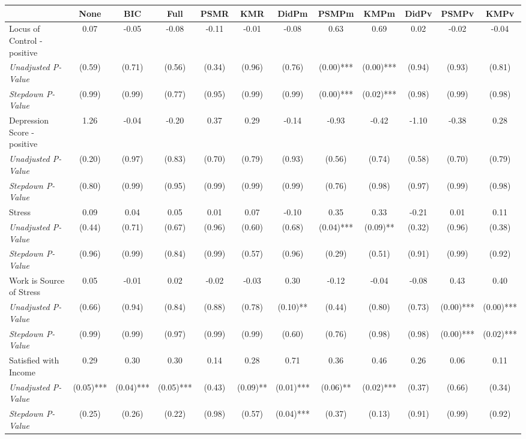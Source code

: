 \begin{tabular}{l c c c c c c c c c c c}
\toprule
 & None & BIC & Full & PSMR & KMR & DidPm & PSMPm & KMPm & DidPv & PSMPv & KMPv \\
\midrule
Locus of Control - positive & 0.07 & -0.05 & -0.08 & -0.11 & -0.01 & -0.08 & 0.63 & 0.69 & 0.02 & -0.02 & -0.04 \\
\quad \textit{Unadjusted P-Value} & (0.59) & (0.71) & (0.56) & (0.34) & (0.96) & (0.76) & (0.00)*** & (0.00)*** & (0.94) & (0.93) & (0.81) \\
\quad \textit{Stepdown P-Value} & (0.99) & (0.99) & (0.77) & (0.95) & (0.99) & (0.99) & (0.00)*** & (0.02)*** & (0.98) & (0.99) & (0.98) \\
Depression Score - positive & 1.26 & -0.04 & -0.20 & 0.37 & 0.29 & -0.14 & -0.93 & -0.42 & -1.10 & -0.38 & 0.28 \\
\quad \textit{Unadjusted P-Value} & (0.20) & (0.97) & (0.83) & (0.70) & (0.79) & (0.93) & (0.56) & (0.74) & (0.58) & (0.70) & (0.79) \\
\quad \textit{Stepdown P-Value} & (0.80) & (0.99) & (0.95) & (0.99) & (0.99) & (0.99) & (0.76) & (0.98) & (0.97) & (0.99) & (0.98) \\
Stress & 0.09 & 0.04 & 0.05 & 0.01 & 0.07 & -0.10 & 0.35 & 0.33 & -0.21 & 0.01 & 0.11 \\
\quad \textit{Unadjusted P-Value} & (0.44) & (0.71) & (0.67) & (0.96) & (0.60) & (0.68) & (0.04)*** & (0.09)** & (0.32) & (0.96) & (0.38) \\
\quad \textit{Stepdown P-Value} & (0.96) & (0.99) & (0.84) & (0.99) & (0.57) & (0.96) & (0.29) & (0.51) & (0.91) & (0.99) & (0.92) \\
Work is Source of Stress & 0.05 & -0.01 & 0.02 & -0.02 & -0.03 & 0.30 & -0.12 & -0.04 & -0.08 & 0.43 & 0.40 \\
\quad \textit{Unadjusted P-Value} & (0.66) & (0.94) & (0.84) & (0.88) & (0.78) & (0.10)** & (0.44) & (0.80) & (0.73) & (0.00)*** & (0.00)*** \\
\quad \textit{Stepdown P-Value} & (0.99) & (0.99) & (0.97) & (0.99) & (0.99) & (0.60) & (0.76) & (0.98) & (0.98) & (0.00)*** & (0.02)*** \\
Satisfied with Income & 0.29 & 0.30 & 0.30 & 0.14 & 0.28 & 0.71 & 0.36 & 0.46 & 0.26 & 0.06 & 0.11 \\
\quad \textit{Unadjusted P-Value} & (0.05)*** & (0.04)*** & (0.05)*** & (0.43) & (0.09)** & (0.01)*** & (0.06)** & (0.02)*** & (0.37) & (0.66) & (0.34) \\
\quad \textit{Stepdown P-Value} & (0.25) & (0.26) & (0.22) & (0.98) & (0.57) & (0.04)*** & (0.37) & (0.13) & (0.91) & (0.99) & (0.92) \\

\end{tabular}
